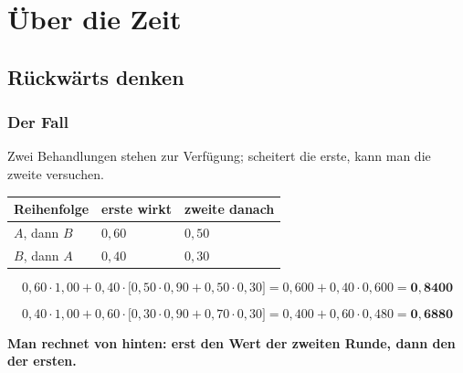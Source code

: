 \part{Über die Zeit}

\chapter{Rückwärts denken}

\section{Der Fall}

\begin{merksatz}
Zwei Behandlungen stehen zur Verfügung; scheitert die erste, kann man die zweite versuchen.

\begin{center}
{\small
\renewcommand{\arraystretch}{1.5}
\begin{tabular}{@{}P{2.4cm}P{2.6cm}P{2.8cm}@{}}
\toprule
\textbf{Reihenfolge} & \textbf{erste wirkt} & \textbf{zweite danach}\\
\midrule
$A$, dann $B$ & $0{,}60$ & $0{,}50$\\
$B$, dann $A$ & $0{,}40$ & $0{,}30$\\
\bottomrule
\end{tabular}}
\end{center}

\begin{center}
\begin{minipage}{0.88\textwidth}
\end{minipage}
\end{center}
\end{merksatz}

\begin{merksatz}
\[ 0{,}60\cdot1{,}00 + 0{,}40\cdot\bigl[0{,}50\cdot0{,}90 + 0{,}50\cdot0{,}30\bigr] = 0{,}600 + 0{,}40\cdot0{,}600 = \mathbf{0{,}8400} \]

\[ 0{,}40\cdot1{,}00 + 0{,}60\cdot\bigl[0{,}30\cdot0{,}90 + 0{,}70\cdot0{,}30\bigr] = 0{,}400 + 0{,}60\cdot0{,}480 = \mathbf{0{,}6880} \]

\begin{center}
\begin{minipage}{0.9\textwidth}
\textbf{Man rechnet von hinten: erst den Wert der zweiten Runde, dann den der ersten.}
\end{minipage}
\end{center}
\end{merksatz}

